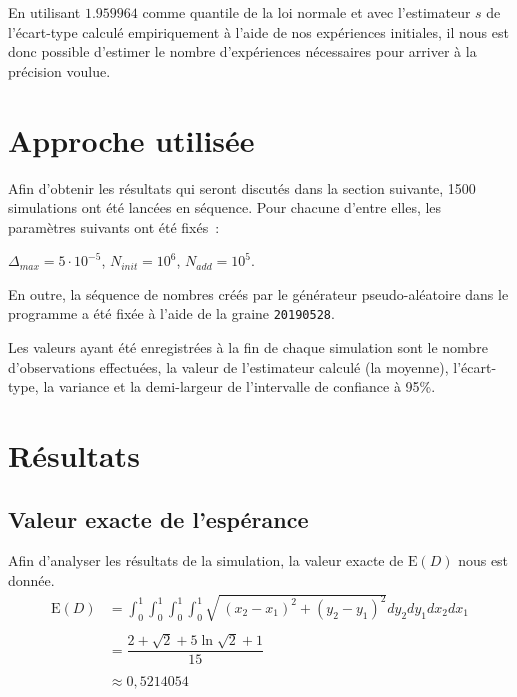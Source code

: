 \documentclass[paper=a4, fontsize=11pt]{scrartcl}
\begin{document}
En utilisant $1.959964$ comme quantile de la loi normale et avec l'estimateur $s$ de l'écart-type calculé empiriquement à l'aide de nos expériences initiales, il nous est donc possible d'estimer le nombre d'expériences nécessaires pour arriver à la précision voulue.

\section{Approche utilisée}

Afin d'obtenir les résultats qui seront discutés dans la section suivante, 1500 simulations ont été lancées en séquence. Pour chacune d'entre elles, les paramètres suivants ont été fixés~:

$\Delta_{max} = 5\cdot 10^{-5}$,\hspace{20pt} $N_{init} = 10^6$,\hspace{20pt} $N_{add} = 10^5$.

En outre, la séquence de nombres créés par le générateur pseudo-aléatoire dans le programme a été fixée à l'aide de la graine \texttt{20190528}.

Les valeurs ayant été enregistrées à la fin de chaque simulation sont le nombre d'observations effectuées, la valeur de l'estimateur calculé (la moyenne), l'écart-type, la variance et la demi-largeur de l'intervalle de confiance à 95\%.

\section{Résultats}

\subsection{Valeur exacte de l'espérance}

Afin d'analyser les résultats de la simulation, la valeur exacte de $\text{E}(D)$ nous est donnée.
\begin{align*}
  \text{E}(D) &= \int _0^1\int _0^1\int _0^1\int _0^1\sqrt{\:\left(x_2-x_1\right)^2+\left(y_2-y_1\right)^2}dy_2dy_1dx_2dx_1 \\ \\
  &= \dfrac{2 + \sqrt{2} + 5\ln{\sqrt{2} + 1}}{15} \\ \\
  &\approx 0,5214054
\end{align*}
\end{document}
